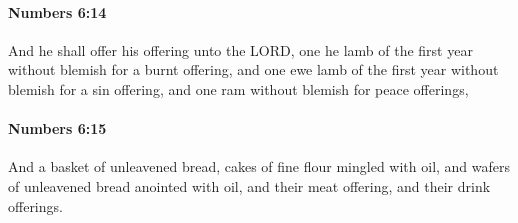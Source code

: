 		\paragraph{Numbers 6:14} %
			\label{NUMBERS-6-14}

			And he shall offer his offering unto the LORD, one he lamb of the first year without blemish for a burnt offering, and one ewe lamb of the first year without blemish for a sin offering, and one ram without blemish for peace offerings,


		\paragraph{Numbers 6:15} %
			\label{NUMBERS-6-15}

			And a basket of unleavened bread, cakes of fine flour mingled with oil, and wafers of unleavened bread anointed with oil, and their meat offering, and their drink offerings.

